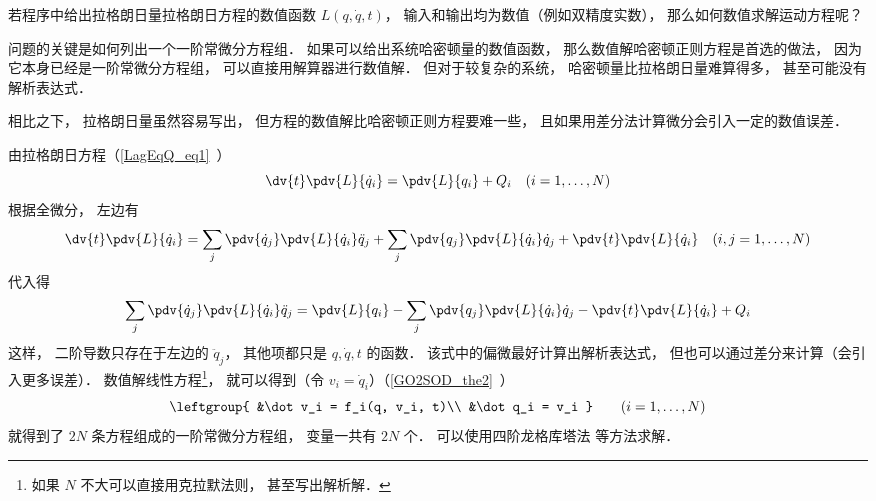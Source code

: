 
\begin{issues}
\issueDraft
\end{issues}


若程序中给出拉格朗日量拉格朗日方程的数值函数 $L(q, \dot q, t)$， 输入和输出均为数值（例如双精度实数）， 那么如何数值求解运动方程呢？

问题的关键是如何列出一个一阶常微分方程组． 如果可以给出系统哈密顿量的数值函数， 那么数值解哈密顿正则方程是首选的做法， 因为它本身已经是一阶常微分方程组， 可以直接用解算器进行数值解． 但对于较复杂的系统， 哈密顿量比拉格朗日量难算得多， 甚至可能没有解析表达式．

相比之下， 拉格朗日量虽然容易写出， 但方程的数值解比哈密顿正则方程要难一些， 且如果用差分法计算微分会引入一定的数值误差．

由拉格朗日方程（\autoref{LagEqQ_eq1}~）
\begin{equation}
\dv{t} \pdv{L}{\dot q_i} = \pdv{L}{q_i} + Q_i
\quad (i=1,\dots,N)
\end{equation}
根据全微分， 左边有
\begin{equation}
\dv{t} \pdv{L}{\dot q_i} = \sum_j\pdv{\dot q_j}\pdv{L}{\dot q_i}\ddot q_j + \sum_j\pdv{q_j}\pdv{L}{\dot q_i}\dot q_j + \pdv{t}\pdv{L}{\dot q_i} \quad (i,j=1,\dots,N)
\end{equation}
代入得
\begin{equation}
\sum_j\pdv{\dot q_j}\pdv{L}{\dot q_i}\ddot q_j = \pdv{L}{q_i} - \sum_j\pdv{q_j}\pdv{L}{\dot q_i}\dot q_j - \pdv{t}\pdv{L}{\dot q_i} + Q_i
\end{equation}
这样， 二阶导数只存在于左边的 $\ddot q_j$， 其他项都只是 $q,\dot q, t$ 的函数． 该式中的偏微最好计算出解析表达式， 但也可以通过差分来计算（会引入更多误差）． 数值解线性方程\footnote{如果 $N$ 不大可以直接用克拉默法则， 甚至写出解析解．}， 就可以得到（令 $v_i = \dot q_i$）（\autoref{GO2SOD_the2}~）
\begin{equation}
\leftgroup{
&\dot v_i = f_i(q, v_i, t)\\
&\dot q_i = v_i
}\qquad (i = 1,\dots,N)
\end{equation}
就得到了 $2N$ 条方程组成的一阶常微分方程组， 变量一共有 $2N$ 个． 可以使用四阶龙格库塔法 等方法求解．

